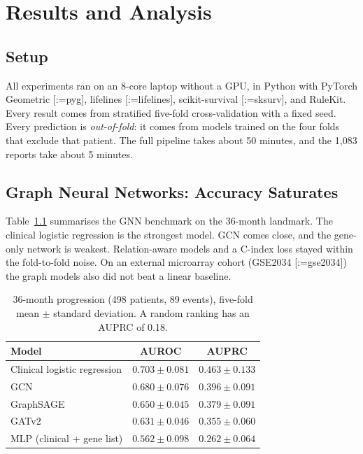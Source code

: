 \documentclass{mnnit}
\makeatletter
\newcommand{\rc}[1]{[\def\rc@sep{}\@for\rc@key:=#1\do{\rc@sep\ref{ref:\rc@key}\def\rc@sep{, }}]}
\makeatother
\begin{document}
\chapter{Results and Analysis}\label{ch:results}

\section{Setup}
All experiments ran on an 8-core laptop without a GPU, in Python with PyTorch Geometric \rc{pyg}, lifelines
\rc{lifelines}, scikit-survival \rc{sksurv}, and RuleKit. Every result comes from stratified five-fold
cross-validation with a fixed seed. Every prediction is \emph{out-of-fold}: it comes from models trained on the four
folds that exclude that patient. The full pipeline takes about 50 minutes, and the 1,083 reports take about 5 minutes.

\section{Graph Neural Networks: Accuracy Saturates}
Table~\ref{tab:gnn} summarises the GNN benchmark on the 36-month landmark. The clinical logistic regression is the
strongest model. GCN comes close, and the gene-only network is weakest. Relation-aware models and a C-index loss stayed
within the fold-to-fold noise. On an external microarray cohort (GSE2034 \rc{gse2034}) the graph models also did not beat
a linear baseline.

\begin{table}[!htbp]
  \centering
  \small\setlength{\tabcolsep}{5pt}
  \caption{36-month progression (498 patients, 89 events), five-fold mean $\pm$ standard deviation. A random ranking
  has an AUPRC of 0.18.}
  \label{tab:gnn}
  \begin{tabular}{lcc}
    \toprule
    Model & AUROC & AUPRC \\
    \midrule
    Clinical logistic regression & $0.703 \pm 0.081$ & $0.463 \pm 0.133$ \\
    GCN & $0.680 \pm 0.076$ & $0.396 \pm 0.091$ \\
    GraphSAGE & $0.650 \pm 0.045$ & $0.379 \pm 0.091$ \\
    GATv2 & $0.631 \pm 0.046$ & $0.355 \pm 0.060$ \\
    MLP (clinical + gene list) & $0.562 \pm 0.098$ & $0.262 \pm 0.064$ \\
    \bottomrule
  \end{tabular}
\end{table}
\end{document}
